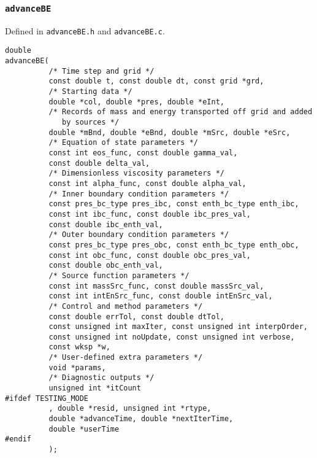 \documentclass[12pt]{article}
\begin{document}
\subsubsection{\texttt{advanceBE}}
\label{sssec:advanceBE}

Defined in \texttt{advanceBE.h} and \texttt{advanceBE.c}.

\begin{verbatim}
double 
advanceBE(
          /* Time step and grid */
          const double t, const double dt, const grid *grd, 
          /* Starting data */
          double *col, double *pres, double *eInt,
          /* Records of mass and energy transported off grid and added
             by sources */
          double *mBnd, double *eBnd, double *mSrc, double *eSrc,
          /* Equation of state parameters */
          const int eos_func, const double gamma_val, 
          const double delta_val,
          /* Dimensionless viscosity parameters */
          const int alpha_func, const double alpha_val,
          /* Inner boundary condition parameters */
          const pres_bc_type pres_ibc, const enth_bc_type enth_ibc,
          const int ibc_func, const double ibc_pres_val, 
          const double ibc_enth_val,
          /* Outer boundary condition parameters */
          const pres_bc_type pres_obc, const enth_bc_type enth_obc,
          const int obc_func, const double obc_pres_val, 
          const double obc_enth_val,
          /* Source function parameters */
          const int massSrc_func, const double massSrc_val,
          const int intEnSrc_func, const double intEnSrc_val,
          /* Control and method parameters */
          const double errTol, const double dtTol,
          const unsigned int maxIter, const unsigned int interpOrder, 
          const unsigned int noUpdate, const unsigned int verbose, 
          const wksp *w, 
          /* User-defined extra parameters */
          void *params,
          /* Diagnostic outputs */
          unsigned int *itCount
#ifdef TESTING_MODE
          , double *resid, unsigned int *rtype,
          double *advanceTime, double *nextIterTime,
          double *userTime
#endif
          );
\end{verbatim}
\end{document}
